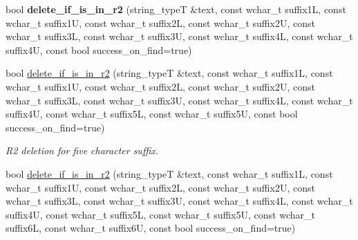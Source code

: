 \begin{DoxyCompactItemize}
\item 
\hypertarget{classstemming_1_1stem_a3a79fd0ac96d009d0c93f1bec847c2ff}{bool {\bfseries delete\+\_\+if\+\_\+is\+\_\+in\+\_\+r2} (string\+\_\+type\+T \&text, const wchar\+\_\+t suffix1\+L, const wchar\+\_\+t suffix1\+U, const wchar\+\_\+t suffix2\+L, const wchar\+\_\+t suffix2\+U, const wchar\+\_\+t suffix3\+L, const wchar\+\_\+t suffix3\+U, const wchar\+\_\+t suffix4\+L, const wchar\+\_\+t suffix4\+U, const bool success\+\_\+on\+\_\+find=true)}\label{classstemming_1_1stem_a3a79fd0ac96d009d0c93f1bec847c2ff}

\item 
\hypertarget{classstemming_1_1stem_a222f7af1124d34e58b3c38fa4b2ee669}{bool \hyperlink{classstemming_1_1stem_a222f7af1124d34e58b3c38fa4b2ee669}{delete\+\_\+if\+\_\+is\+\_\+in\+\_\+r2} (string\+\_\+type\+T \&text, const wchar\+\_\+t suffix1\+L, const wchar\+\_\+t suffix1\+U, const wchar\+\_\+t suffix2\+L, const wchar\+\_\+t suffix2\+U, const wchar\+\_\+t suffix3\+L, const wchar\+\_\+t suffix3\+U, const wchar\+\_\+t suffix4\+L, const wchar\+\_\+t suffix4\+U, const wchar\+\_\+t suffix5\+L, const wchar\+\_\+t suffix5\+U, const bool success\+\_\+on\+\_\+find=true)}\label{classstemming_1_1stem_a222f7af1124d34e58b3c38fa4b2ee669}

\begin{DoxyCompactList}\small\item\em R2 deletion for five character suffix. \end{DoxyCompactList}\item 
\hypertarget{classstemming_1_1stem_a95aca52d1f624638130a9d1c66570edb}{bool \hyperlink{classstemming_1_1stem_a95aca52d1f624638130a9d1c66570edb}{delete\+\_\+if\+\_\+is\+\_\+in\+\_\+r2} (string\+\_\+type\+T \&text, const wchar\+\_\+t suffix1\+L, const wchar\+\_\+t suffix1\+U, const wchar\+\_\+t suffix2\+L, const wchar\+\_\+t suffix2\+U, const wchar\+\_\+t suffix3\+L, const wchar\+\_\+t suffix3\+U, const wchar\+\_\+t suffix4\+L, const wchar\+\_\+t suffix4\+U, const wchar\+\_\+t suffix5\+L, const wchar\+\_\+t suffix5\+U, const wchar\+\_\+t suffix6\+L, const wchar\+\_\+t suffix6\+U, const bool success\+\_\+on\+\_\+find=true)}\label{classstemming_1_1stem_a95aca52d1f624638130a9d1c66570edb}


\end{DoxyCompactItemize}
